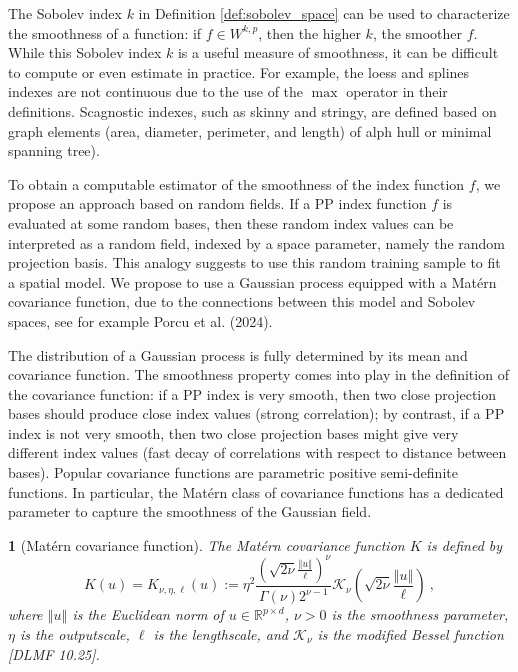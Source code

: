 \documentclass[
  12pt,
]{interact}
\theoremstyle{plain}
\newtheorem{defn}{\protect\definitionname}
\providecommand{\definitionname}{Definition}
\begin{document}
The Sobolev index \(k\) in Definition \ref{def:sobolev_space} can be
used to characterize the smoothness of a function: if \(f\in W^{k,p}\),
then the higher \(k\), the smoother \(f\). While this Sobolev index
\(k\) is a useful measure of smoothness, it can be difficult to compute
or even estimate in practice. For example, the loess and splines indexes
are not continuous due to the use of the \(\max\) operator in their
definitions. Scagnostic indexes, such as skinny and stringy, are defined
based on graph elements (area, diameter, perimeter, and length) of alph
hull or minimal spanning tree).

To obtain a computable estimator of the smoothness of the index function
\(f\), we propose an approach based on random fields. If a PP index
function \(f\) is evaluated at some random bases, then these random
index values can be interpreted as a random field, indexed by a space
parameter, namely the random projection basis. This analogy suggests to
use this random training sample to fit a spatial model. We propose to
use a Gaussian process equipped with a Matérn covariance function, due
to the connections between this model and Sobolev spaces, see for
example Porcu et al. (2024).

The distribution of a Gaussian process is fully determined by its mean
and covariance function. The smoothness property comes into play in the
definition of the covariance function: if a PP index is very smooth,
then two close projection bases should produce close index values
(strong correlation); by contrast, if a PP index is not very smooth,
then two close projection bases might give very different index values
(fast decay of correlations with respect to distance between bases).
Popular covariance functions are parametric positive semi-definite
functions. In particular, the Matérn class of covariance functions has a
dedicated parameter to capture the smoothness of the Gaussian field.

\begin{defn}[Matérn covariance function]\label{def:matern}
The Matérn covariance function $K$ is defined by
\begin{equation}
K(u)=K_{\nu,\eta,\ell}(u):=\eta^2\frac{\left(\sqrt{2\nu}\frac{\left\Vert u\right\Vert}{\ell}\right)^{\nu}}{\Gamma(\nu)2^{\nu-1}}\mathcal{K}_{\nu}\left(\sqrt{2\nu}\frac{\left\Vert u\right\Vert}{\ell}\right)\ ,\label{eq:matern}
\end{equation}
where $\left\Vert u\right\Vert$ is the Euclidean norm of $u\in\mathbb{R}^{p{\times}d}$, $\nu>0$ is the smoothness parameter, $\eta$ is the outputscale, $\ell$ is the lengthscale, and $\mathcal{K}_\nu$ is
the modified Bessel function [DLMF 10.25].
\end{defn}
\end{document}
